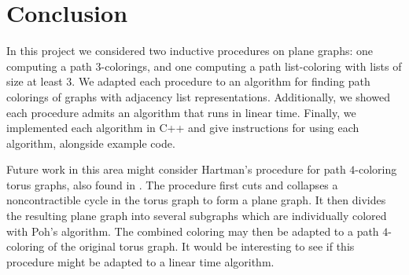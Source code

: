 \documentclass[letterpaper, 12pt]{article}
\theoremstyle{definition}
\theoremstyle{definition}
\theoremstyle{thm}
\theoremstyle{definition}
\begin{document}
\section{Conclusion}

In this project we considered two inductive procedures on plane graphs: one
computing a path $3$-colorings, and one computing a path list-coloring with
lists of size at least $3$. We adapted each procedure to an
algorithm for finding path colorings of graphs with adjacency list
representations. Additionally, we showed each procedure admits an algorithm that
runs in linear time.
Finally, we implemented each algorithm in C++ and give instructions for
using each algorithm, alongside example code.

Future work in this area might consider Hartman's procedure for path
$4$-coloring torus graphs, also found in \cite{hartman}. The procedure first
cuts and collapses a noncontractible cycle in the torus graph to form a plane
graph. It then divides the resulting plane graph
into several subgraphs which are individually colored with Poh's algorithm.
The combined coloring may then be adapted to a path $4$-coloring of the original
torus graph. It would be interesting to see if this procedure might be adapted to
a linear time algorithm.
\end{document}
